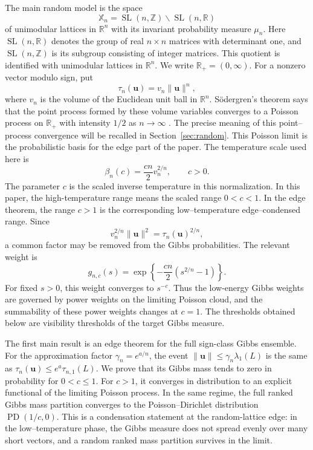 \documentclass[a4paper,12pt]{article}
\theoremstyle{definition}
\theoremstyle{remark}
\newcommand{\re}{\mathbb R}
\newcommand{\ze}{\mathbb Z}
\newcommand{\PD}{\operatorname{PD}}
\newcommand{\SL}{\operatorname{SL}}
\begin{document}
The main random model is the space
$$
\mathbb X_n=\SL(n,\ze)\backslash\SL(n,\re)
$$
of unimodular lattices in $\re^n$ with its invariant probability measure $\mu_n$.
Here $\SL(n,\re)$ denotes the group of real $n\times n$ matrices with
determinant one, and $\SL(n,\ze)$ is its subgroup consisting of integer matrices.
This quotient is identified with unimodular lattices in $\re^n$.
We write $\re_+=(0,\infty)$.
For a nonzero vector modulo sign, put
$$
\tau_n(\bm u)=v_n\|\bm u\|^n,
$$
where $v_n$ is the volume of the Euclidean unit ball in $\re^n$.
S\"odergren's theorem says that the point process formed by these volume
variables converges to a Poisson process on $\re_+$ with intensity $1/2$ as $n\to\infty$ \cite{Sodergren11}.
The precise meaning of this point--process convergence will be recalled in Section~\ref{sec:random}.
This Poisson limit is the probabilistic basis for the edge part of the paper.
The temperature scale used here is
$$
\beta_n(c)=\frac{cn}{2}v_n^{2/n}, \qquad c>0.
$$
The parameter $c$ is the scaled inverse temperature in this normalization.
In this paper, the high-temperature range means the scaled range $0<c<1$.
In the edge theorem, the range $c>1$ is the corresponding low--temperature edge--condensed range.
Since
$$
v_n^{2/n}\|\bm u\|^2=\tau_n(\bm u)^{2/n},
$$
a common factor may be removed from the Gibbs probabilities.
The relevant weight is
$$
g_{n,c}(s)=\exp\left\{-\frac{cn}{2}(s^{2/n}-1)\right\}.
$$
For fixed $s>0$, this weight converges to $s^{-c}$.
Thus the low-energy Gibbs weights are governed by power weights on 
the limiting Poisson cloud, and the summability of these power weights changes at $c=1$.
The thresholds obtained below are visibility thresholds of the target Gibbs measure.

The first main result is an edge theorem for the full sign-class Gibbs ensemble.
For the approximation factor $\gamma_n=e^{a/n}$, the event
$\|\bm u\|\le \gamma_n\lambda_1(L)$ is the same as $\tau_n(\bm u)\le e^a\tau_{n,1}(L)$.
We prove that its Gibbs mass tends to zero in probability for $0<c\le1$.
For $c>1$, it converges in distribution to an explicit functional of the limiting Poisson process.
In the same regime, the full ranked Gibbs mass partition converges to the
Poisson--Dirichlet distribution $\PD(1/c,0)$.
This is a condensation statement at the random-lattice edge:
in the low--temperature phase, the Gibbs measure does not spread evenly over
many short vectors, and a random ranked mass partition survives in the limit.
\end{document}
